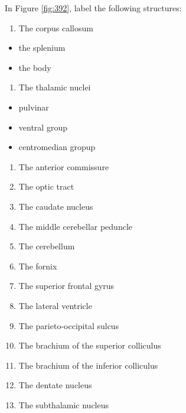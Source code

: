 \documentclass[]{book}
\providecommand{\tightlist}{%
  \setlength{\itemsep}{0pt}\setlength{\parskip}{0pt}}
\begin{document}
In Figure \ref{fig:392}, label the following structures:

\begin{enumerate}
\def\labelenumi{\arabic{enumi}.}
\tightlist
\item
  The corpus callosum
\end{enumerate}

\begin{itemize}
\tightlist
\item
  the splenium
\item
  the body
\end{itemize}

\begin{enumerate}
\def\labelenumi{\arabic{enumi}.}
\tightlist
\item
  The thalamic nuclei
\end{enumerate}

\begin{itemize}
\tightlist
\item
  pulvinar
\item
  ventral group
\item
  centromedian gropup
\end{itemize}

\begin{enumerate}
\def\labelenumi{\arabic{enumi}.}
\tightlist
\item
  The anterior commissure
\item
  The optic tract
\item
  The caudate nucleus
\item
  The middle cerebellar peduncle
\item
  The cerebellum
\item
  The fornix
\item
  The superior frontal gyrus
\item
  The lateral ventricle
\item
  The parieto-occipital sulcus
\item
  The brachium of the superior colliculus
\item
  The brachium of the inferior colliculus
\item
  The dentate nucleus
\item
  The subthalamic nucleus
\end{enumerate}
\end{document}
